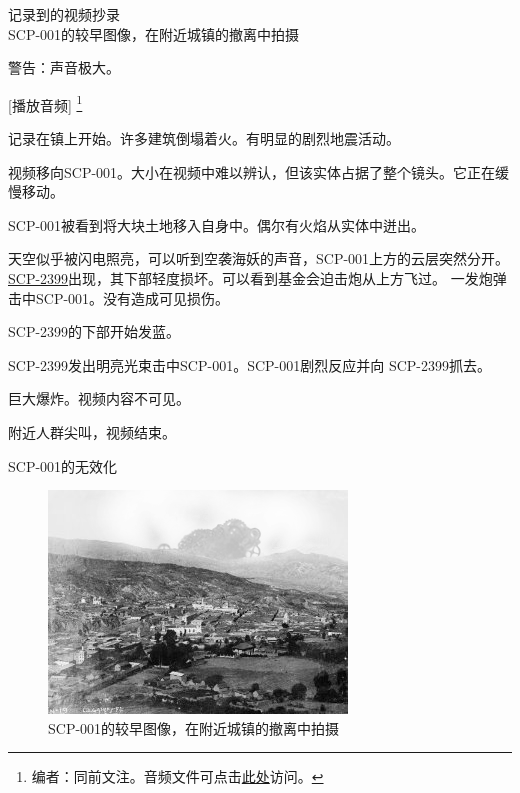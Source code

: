 记录到的视频抄录 \\
SCP-001的较早图像，在附近城镇的撤离中拍摄


警告：声音极大。

[播放音频]
\footnote{
编者\QIS：同前文注。音频文件可点击\href{http://scp-wiki.wdfiles.com/local--files/twistedgears-kaktus-proposal/Apotheosis.mp3}{此处}访问。}

\begin{scpbox}

记录在镇上开始。许多建筑倒塌着火。有明显的剧烈地震活动。

视频移向SCP-001。大小在视频中难以辨认，但该实体占据了整个镜头。它正在缓慢移动。

SCP-001被看到将大块土地移入自身中。偶尔有火焰从实体中迸出。

天空似乎被闪电照亮，可以听到空袭海妖的声音，SCP-001上方的云层突然分开。\hyperref[chap:SCP-2399]{SCP-2399}出现，其下部轻度损坏。可以看到基金会迫击炮从上方飞过。
一发炮弹击中SCP-001。没有造成可见损伤。

SCP-2399的下部开始发蓝。

SCP-2399发出明亮光束击中SCP-001。SCP-001剧烈反应并向 SCP-2399抓去。

巨大爆炸。视频内容不可见。

附近人群尖叫，视频结束。

\end{scpbox}

SCP-001的无效化

\begin{figure}[H]
	\centering
	\includegraphics[width=0.5\linewidth]{images/SCP-001-the-broken-god-7.png}
	\caption*{SCP-001的较早图像，在附近城镇的撤离中拍摄}
\end{figure}

